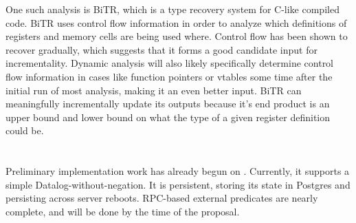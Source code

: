 One such analysis is BiTR\cite{bitr}, which is a type recovery system for C-like compiled code.
BiTR uses control flow information in order to analyze which definitions of registers and memory cells are being used where.
Control flow has been shown\cite{jakstab} to recover gradually, which suggests that it forms a good candidate input for incrementality.
Dynamic analysis will also likely specifically determine control flow information in cases like function pointers or vtables some time after the initial run of most analysis, making it an even better input.
BiTR can meaningfully incrementally update its outputs because it's end product is an upper bound and lower bound on what the type of a given register definition could be.

\section{\sysname}
Preliminary implementation work has already begun on \sysname.
Currently, it supports a simple Datalog-without-negation.
It is persistent, storing its state in Postgres and persisting across server reboots.
RPC-based external predicates are nearly complete, and will be done by the time of the proposal.
